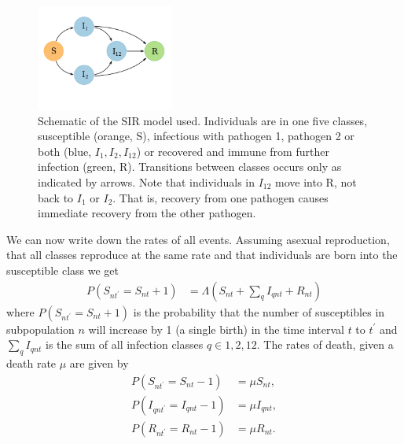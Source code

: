 \begin{figure}[t]
\centering
  \includegraphics[width=0.4\textwidth]{imgs/SIRoption1.pdf}
  \caption[Schematic of the SIR model used]{
Schematic of the SIR model used. 
Individuals are in one five classes, susceptible (orange, S), infectious with pathogen 1, pathogen 2 or both (blue, $I_1, I_2, I_{12}$) or recovered and immune from further infection (green, R).
Transitions between classes occurs only as indicated by arrows.
Note that individuals in $I_{12}$ move into R, not back to $I_1$ or $I_2$. 
That is, recovery from one pathogen causes immediate recovery from the other pathogen.
}
  \label{f:sir}
\end{figure}


We can now write down the rates of all events. 
Assuming asexual reproduction, that all classes reproduce at the same rate and that individuals are born into the susceptible class we get
\begin{align}
  P\left( S_{nt^\prime} = S_{nt} +1\right) &= \Lambda\left( S_{nt}+\sum_q I_{qnt} + R_{nt}\right) 
\end{align}
where $P\left( S_{nt^\prime} = S_{nt} +1\right)$ is the probability that the number of susceptibles in subpopulation $n$ will increase by 1 (a single birth) in the time interval $t$ to $t^\prime$ and $\sum_q I_{qnt}$ is the sum of all infection classes $q \in {1, 2, 12}$.
The rates of death, given a death rate $\mu$ are given by
\begin{align}
  P\left( S_{nt^\prime} = S_{nt}-1 \right) &= \mu S_{nt}, \\
  P\left( I_{qnt^\prime} = I_{qnt}-1 \right) &= \mu I_{qnt},\\
  P\left( R_{nt^\prime} = R_{nt}-1 \right) &= \mu R_{nt}.
\end{align}

